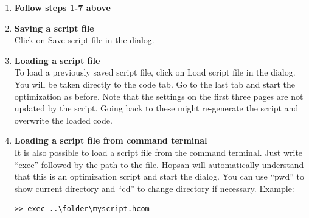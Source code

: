 \documentclass[a4paper]{article}
\begin{document}
\begin{enumerate}
\item \textbf{Follow steps 1-7 above} \\

\item \textbf{Saving a script file} \\
Click on Save script file in the dialog.

\item \textbf{Loading a script file} \\
To load a previously saved script file, click on Load script file in the dialog. You will be taken directly to the code tab. Go to the last tab and start the optimization as before. Note that the settings on the first three pages are not updated by the script. Going back to these might re-generate the script and overwrite the loaded code.

\item \textbf{Loading a script file from command terminal} \\
It is also possible to load a script file from the command terminal. Just write ``exec'' followed by the path to the file. Hopsan will automatically understand that this is an optimization script and start the dialog. You can use “pwd” to show current directory and “cd” to change directory if necessary. Example:	
\begin{verbatim}
>> exec ..\folder\myscript.hcom
\end{verbatim}

\end{enumerate}
\end{document}
